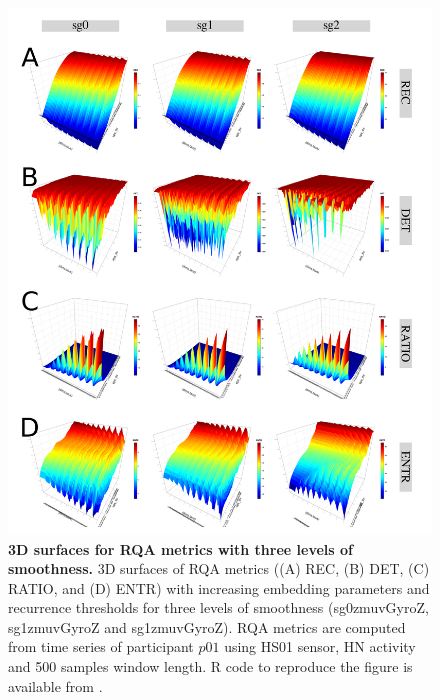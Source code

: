 \begin{figure}[!ht]
\centering
\includegraphics[width=1.0\textwidth]{s}
    \caption{
	{\bf 3D surfaces for RQA metrics with three levels of smoothness.}
	3D surfaces of RQA metrics ((A) REC, (B) DET, (C) RATIO, and (D) ENTR) 
	with increasing embedding parameters and recurrence thresholds for 
	three levels of smoothness 
	(sg0zmuvGyroZ, sg1zmuvGyroZ and sg1zmuvGyroZ).
	RQA metrics are computed from time series of participant $p01$ using 
	HS01 sensor, HN activity and 500 samples window length.
	R code to reproduce the figure is available from \cite{hwum2018}.
 }
\label{fig:topo_smoothness}
\end{figure}



